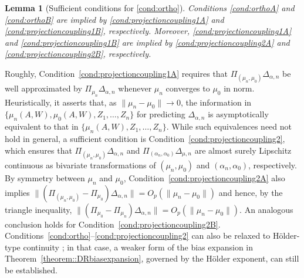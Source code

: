 \documentclass[11pt]{article}
\theoremstyle{plain}
\newtheorem{lemma}{Lemma}
\begin{document}
 \begin{lemma}[Sufficient conditions for \ref{cond:ortho}]
 \label{lemma::sufficientcoupling}
Conditions \ref{cond:orthoA} and \ref{cond:orthoB} are implied by
\ref{cond:projectioncoupling1A} and \ref{cond:projectioncoupling1B},
respectively. Moreover, \ref{cond:projectioncoupling1A} and
\ref{cond:projectioncoupling1B} are implied by
\ref{cond:projectioncoupling2A} and \ref{cond:projectioncoupling2B},
respectively.
\end{lemma}
 
 

Roughly, Condition~\ref{cond:projectioncoupling1A} requires that \(\Pi_{(\mu_n,\mu_0)}\Delta_{\alpha,n}\) be well approximated by \(\Pi_{\mu_n}\Delta_{\alpha,n}\) whenever \(\mu_n\) converges to \(\mu_0\) in norm. Heuristically, it asserts that, as \(\|\mu_n-\mu_0\|\to 0\), the information in \(\{\mu_n(A,W),\mu_0(A,W),Z_1,\ldots,Z_n\}\) for predicting \(\Delta_{\alpha,n}\) is asymptotically equivalent to that in \(\{\mu_n(A,W),Z_1,\ldots,Z_n\}\). While such equivalences need not hold in general, a sufficient condition is Condition~\ref{cond:projectioncoupling2}, which ensures that \(\Pi_{(\mu_n,\mu_0)}\Delta_{\alpha,n}\) and \(\Pi_{(\alpha_n,\alpha_0)}\Delta_{\mu,n}\) are almost surely Lipschitz continuous as bivariate transformations of \((\mu_n,\mu_0)\) and \((\alpha_n,\alpha_0)\), respectively. By symmetry between \(\mu_n\) and \(\mu_0\), Condition~\ref{cond:projectioncoupling2A} also implies \(\|(\Pi_{(\mu_n,\mu_0)}-\Pi_{\mu_0})\Delta_{\alpha,n}\| = O_p(\|\mu_n-\mu_0\|)\) and hence, by the triangle inequality, \(\|(\Pi_{\mu_0}-\Pi_{\mu_n})\Delta_{\alpha,n}\| = O_p(\|\mu_n-\mu_0\|)\). An analogous conclusion holds for Condition~\ref{cond:projectioncoupling2B}. Conditions~\ref{cond:ortho}--\ref{cond:projectioncoupling2} can also be relaxed to H\"older-type continuity \citep{bonvini2024doubly}; in that case, a weaker form of the bias expansion in Theorem~\ref{theorem::DRbiasexpansion}, governed by the H\"older exponent, can still be established.
\end{document}
